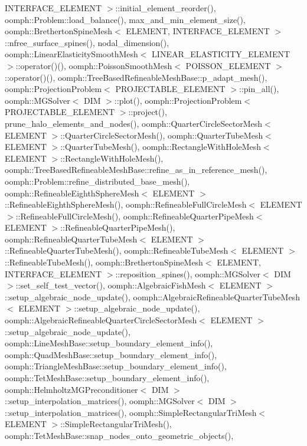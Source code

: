 I\+N\+T\+E\+R\+F\+A\+C\+E\+\_\+\+E\+L\+E\+M\+E\+N\+T $>$\+::initial\+\_\+element\+\_\+reorder(), oomph\+::\+Problem\+::load\+\_\+balance(), max\+\_\+and\+\_\+min\+\_\+element\+\_\+size(), oomph\+::\+Bretherton\+Spine\+Mesh$<$ E\+L\+E\+M\+E\+N\+T, I\+N\+T\+E\+R\+F\+A\+C\+E\+\_\+\+E\+L\+E\+M\+E\+N\+T $>$\+::nfree\+\_\+surface\+\_\+spines(), nodal\+\_\+dimension(), oomph\+::\+Linear\+Elasticity\+Smooth\+Mesh$<$ L\+I\+N\+E\+A\+R\+\_\+\+E\+L\+A\+S\+T\+I\+C\+I\+T\+Y\+\_\+\+E\+L\+E\+M\+E\+N\+T $>$\+::operator()(), oomph\+::\+Poisson\+Smooth\+Mesh$<$ P\+O\+I\+S\+S\+O\+N\+\_\+\+E\+L\+E\+M\+E\+N\+T $>$\+::operator()(), oomph\+::\+Tree\+Based\+Refineable\+Mesh\+Base\+::p\+\_\+adapt\+\_\+mesh(), oomph\+::\+Projection\+Problem$<$ P\+R\+O\+J\+E\+C\+T\+A\+B\+L\+E\+\_\+\+E\+L\+E\+M\+E\+N\+T $>$\+::pin\+\_\+all(), oomph\+::\+M\+G\+Solver$<$ D\+I\+M $>$\+::plot(), oomph\+::\+Projection\+Problem$<$ P\+R\+O\+J\+E\+C\+T\+A\+B\+L\+E\+\_\+\+E\+L\+E\+M\+E\+N\+T $>$\+::project(), prune\+\_\+halo\+\_\+elements\+\_\+and\+\_\+nodes(), oomph\+::\+Quarter\+Circle\+Sector\+Mesh$<$ E\+L\+E\+M\+E\+N\+T $>$\+::\+Quarter\+Circle\+Sector\+Mesh(), oomph\+::\+Quarter\+Tube\+Mesh$<$ E\+L\+E\+M\+E\+N\+T $>$\+::\+Quarter\+Tube\+Mesh(), oomph\+::\+Rectangle\+With\+Hole\+Mesh$<$ E\+L\+E\+M\+E\+N\+T $>$\+::\+Rectangle\+With\+Hole\+Mesh(), oomph\+::\+Tree\+Based\+Refineable\+Mesh\+Base\+::refine\+\_\+as\+\_\+in\+\_\+reference\+\_\+mesh(), oomph\+::\+Problem\+::refine\+\_\+distributed\+\_\+base\+\_\+mesh(), oomph\+::\+Refineable\+Eighth\+Sphere\+Mesh$<$ E\+L\+E\+M\+E\+N\+T $>$\+::\+Refineable\+Eighth\+Sphere\+Mesh(), oomph\+::\+Refineable\+Full\+Circle\+Mesh$<$ E\+L\+E\+M\+E\+N\+T $>$\+::\+Refineable\+Full\+Circle\+Mesh(), oomph\+::\+Refineable\+Quarter\+Pipe\+Mesh$<$ E\+L\+E\+M\+E\+N\+T $>$\+::\+Refineable\+Quarter\+Pipe\+Mesh(), oomph\+::\+Refineable\+Quarter\+Tube\+Mesh$<$ E\+L\+E\+M\+E\+N\+T $>$\+::\+Refineable\+Quarter\+Tube\+Mesh(), oomph\+::\+Refineable\+Tube\+Mesh$<$ E\+L\+E\+M\+E\+N\+T $>$\+::\+Refineable\+Tube\+Mesh(), oomph\+::\+Bretherton\+Spine\+Mesh$<$ E\+L\+E\+M\+E\+N\+T, I\+N\+T\+E\+R\+F\+A\+C\+E\+\_\+\+E\+L\+E\+M\+E\+N\+T $>$\+::reposition\+\_\+spines(), oomph\+::\+M\+G\+Solver$<$ D\+I\+M $>$\+::set\+\_\+self\+\_\+test\+\_\+vector(), oomph\+::\+Algebraic\+Fish\+Mesh$<$ E\+L\+E\+M\+E\+N\+T $>$\+::setup\+\_\+algebraic\+\_\+node\+\_\+update(), oomph\+::\+Algebraic\+Refineable\+Quarter\+Tube\+Mesh$<$ E\+L\+E\+M\+E\+N\+T $>$\+::setup\+\_\+algebraic\+\_\+node\+\_\+update(), oomph\+::\+Algebraic\+Refineable\+Quarter\+Circle\+Sector\+Mesh$<$ E\+L\+E\+M\+E\+N\+T $>$\+::setup\+\_\+algebraic\+\_\+node\+\_\+update(), oomph\+::\+Line\+Mesh\+Base\+::setup\+\_\+boundary\+\_\+element\+\_\+info(), oomph\+::\+Quad\+Mesh\+Base\+::setup\+\_\+boundary\+\_\+element\+\_\+info(), oomph\+::\+Triangle\+Mesh\+Base\+::setup\+\_\+boundary\+\_\+element\+\_\+info(), oomph\+::\+Tet\+Mesh\+Base\+::setup\+\_\+boundary\+\_\+element\+\_\+info(), oomph\+::\+Helmholtz\+M\+G\+Preconditioner$<$ D\+I\+M $>$\+::setup\+\_\+interpolation\+\_\+matrices(), oomph\+::\+M\+G\+Solver$<$ D\+I\+M $>$\+::setup\+\_\+interpolation\+\_\+matrices(), oomph\+::\+Simple\+Rectangular\+Tri\+Mesh$<$ E\+L\+E\+M\+E\+N\+T $>$\+::\+Simple\+Rectangular\+Tri\+Mesh(), oomph\+::\+Tet\+Mesh\+Base\+::snap\+\_\+nodes\+\_\+onto\+\_\+geometric\+\_\+objects(), 